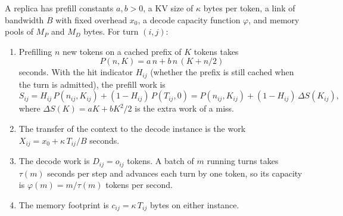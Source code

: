 \begin{definition}[Costs]\label{L1:def:costs}
A replica has prefill constants $a,b>0$, a KV size of $\kappa$ bytes per token, a link
of bandwidth $B$ with fixed overhead $x_0$, a decode capacity function $\varphi$, and
memory pools of $M_P$ and $M_D$ bytes. For turn $(i,j)$:
\begin{enumerate}[label=(\alph*)]
\item Prefilling $n$ new tokens on a cached prefix of $K$ tokens takes
  \begin{equation}\label{L1:eq:prefill}
    P(n,K)=a\,n+b\,n\,(K+n/2)
  \end{equation}
  seconds. With the hit indicator $H_{ij}$ (whether the prefix is still cached when
  the turn is admitted), the prefill work is
  \begin{equation}\label{L1:eq:work}
    S_{ij}=H_{ij}\,P(n_{ij},K_{ij})+(1-H_{ij})\,P(T_{ij},0)
    =P(n_{ij},K_{ij})+(1-H_{ij})\,\Delta S(K_{ij}),
  \end{equation}
  where $\Delta S(K)=aK+bK^2/2$ is the extra work of a miss.
\item The transfer of the context to the decode instance is the work
  $X_{ij}=x_0+\kappa\,T_{ij}/B$ seconds.
\item The decode work is $D_{ij}=o_{ij}$ tokens. A batch of $m$ running turns takes
  $\tau(m)$ seconds per step and advances each turn by one token, so its capacity is
  $\varphi(m)=m/\tau(m)$ tokens per second.
\item The memory footprint is $c_{ij}=\kappa\,T_{ij}$ bytes on either instance.
\end{enumerate}
\end{definition}

